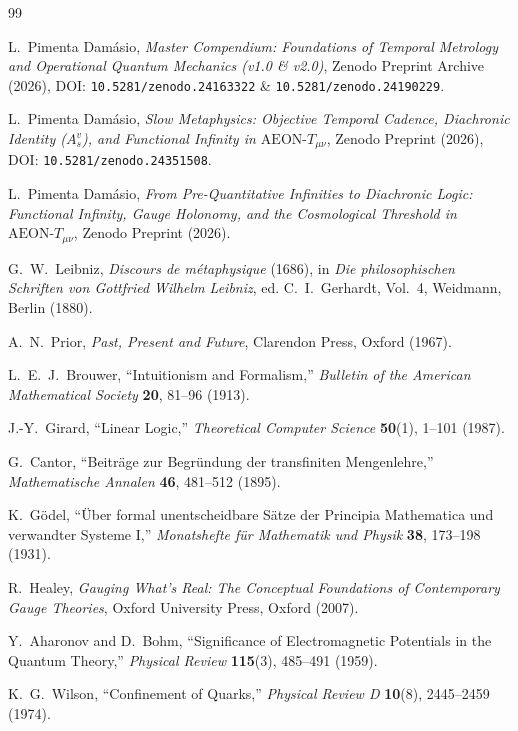\documentclass[11pt,a4paper]{article}
\begin{document}
\begin{thebibliography}{99}

L.~Pimenta Damásio, \emph{Master Compendium: Foundations of Temporal Metrology and Operational Quantum Mechanics (v1.0 \& v2.0)}, Zenodo Preprint Archive (2026), DOI: \texttt{10.5281/zenodo.24163322} \& \texttt{10.5281/zenodo.24190229}.

L.~Pimenta Damásio, \emph{Slow Metaphysics: Objective Temporal Cadence, Diachronic Identity ($A_s^v$), and Functional Infinity in $\text{AEON-}T_{\mu\nu}$}, Zenodo Preprint (2026), DOI: \texttt{10.5281/zenodo.24351508}.

L.~Pimenta Damásio, \emph{From Pre-Quantitative Infinities to Diachronic Logic: Functional Infinity, Gauge Holonomy, and the Cosmological Threshold in $\text{AEON-}T_{\mu\nu}$}, Zenodo Preprint (2026).

G.~W.~Leibniz, \emph{Discours de métaphysique} (1686), in \emph{Die philosophischen Schriften von Gottfried Wilhelm Leibniz}, ed. C.~I.~Gerhardt, Vol.~4, Weidmann, Berlin (1880).

A.~N.~Prior, \emph{Past, Present and Future}, Clarendon Press, Oxford (1967).

L.~E.~J.~Brouwer, ``Intuitionism and Formalism,'' \emph{Bulletin of the American Mathematical Society} \textbf{20}, 81--96 (1913).

J.-Y.~Girard, ``Linear Logic,'' \emph{Theoretical Computer Science} \textbf{50}(1), 1--101 (1987).

G.~Cantor, ``Beiträge zur Begründung der transfiniten Mengenlehre,'' \emph{Mathematische Annalen} \textbf{46}, 481--512 (1895).

K.~Gödel, ``Über formal unentscheidbare Sätze der Principia Mathematica und verwandter Systeme I,'' \emph{Monatshefte für Mathematik und Physik} \textbf{38}, 173--198 (1931).

R.~Healey, \emph{Gauging What's Real: The Conceptual Foundations of Contemporary Gauge Theories}, Oxford University Press, Oxford (2007).

Y.~Aharonov and D.~Bohm, ``Significance of Electromagnetic Potentials in the Quantum Theory,'' \emph{Physical Review} \textbf{115}(3), 485--491 (1959).

K.~G.~Wilson, ``Confinement of Quarks,'' \emph{Physical Review D} \textbf{10}(8), 2445--2459 (1974).


\end{thebibliography}
\end{document}
